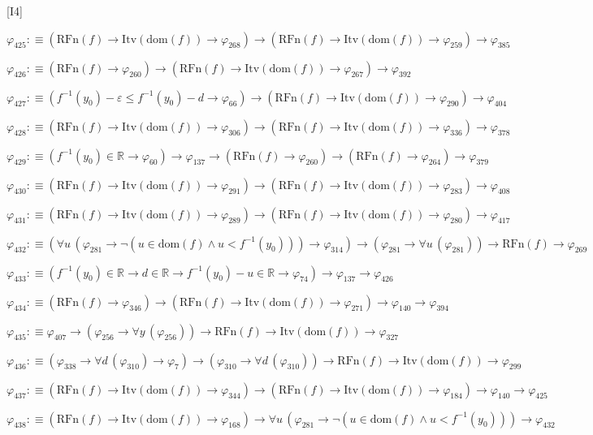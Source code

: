 \begin{fullproof}{[I4]}
\begin{abbrevlist}
\item $\varphi_{425} :\equiv (\mathrm{RFn}(f) \to \mathrm{Itv}(\mathrm{dom}(f)) \to \varphi_{268}) \to (\mathrm{RFn}(f) \to \mathrm{Itv}(\mathrm{dom}(f)) \to \varphi_{259}) \to \varphi_{385}$
\item $\varphi_{426} :\equiv (\mathrm{RFn}(f) \to \varphi_{260}) \to (\mathrm{RFn}(f) \to \mathrm{Itv}(\mathrm{dom}(f)) \to \varphi_{267}) \to \varphi_{392}$
\item $\varphi_{427} :\equiv (f^{-1}(y_{0}) - \varepsilon \leq f^{-1}(y_{0}) - d \to \varphi_{66}) \to (\mathrm{RFn}(f) \to \mathrm{Itv}(\mathrm{dom}(f)) \to \varphi_{290}) \to \varphi_{404}$
\item $\varphi_{428} :\equiv (\mathrm{RFn}(f) \to \mathrm{Itv}(\mathrm{dom}(f)) \to \varphi_{306}) \to (\mathrm{RFn}(f) \to \mathrm{Itv}(\mathrm{dom}(f)) \to \varphi_{336}) \to \varphi_{378}$
\item $\varphi_{429} :\equiv (f^{-1}(y_{0}) \in \mathbb{R} \to \varphi_{60}) \to \varphi_{137} \to (\mathrm{RFn}(f) \to \varphi_{260}) \to (\mathrm{RFn}(f) \to \varphi_{264}) \to \varphi_{379}$
\item $\varphi_{430} :\equiv (\mathrm{RFn}(f) \to \mathrm{Itv}(\mathrm{dom}(f)) \to \varphi_{291}) \to (\mathrm{RFn}(f) \to \mathrm{Itv}(\mathrm{dom}(f)) \to \varphi_{283}) \to \varphi_{408}$
\item $\varphi_{431} :\equiv (\mathrm{RFn}(f) \to \mathrm{Itv}(\mathrm{dom}(f)) \to \varphi_{289}) \to (\mathrm{RFn}(f) \to \mathrm{Itv}(\mathrm{dom}(f)) \to \varphi_{280}) \to \varphi_{417}$
\item $\varphi_{432} :\equiv (\forall u\,(\varphi_{281} \to \neg (u \in \mathrm{dom}(f) \land u < f^{-1}(y_{0}))) \to \varphi_{314}) \to (\varphi_{281} \to \forall u\,(\varphi_{281})) \to \mathrm{RFn}(f) \to \varphi_{269}$
\item $\varphi_{433} :\equiv (f^{-1}(y_{0}) \in \mathbb{R} \to d \in \mathbb{R} \to f^{-1}(y_{0}) - u \in \mathbb{R} \to \varphi_{74}) \to \varphi_{137} \to \varphi_{426}$
\item $\varphi_{434} :\equiv (\mathrm{RFn}(f) \to \varphi_{346}) \to (\mathrm{RFn}(f) \to \mathrm{Itv}(\mathrm{dom}(f)) \to \varphi_{271}) \to \varphi_{140} \to \varphi_{394}$
\item $\varphi_{435} :\equiv \varphi_{407} \to (\varphi_{256} \to \forall y\,(\varphi_{256})) \to \mathrm{RFn}(f) \to \mathrm{Itv}(\mathrm{dom}(f)) \to \varphi_{327}$
\item $\varphi_{436} :\equiv (\varphi_{338} \to \forall d\,(\varphi_{310}) \to \varphi_{7}) \to (\varphi_{310} \to \forall d\,(\varphi_{310})) \to \mathrm{RFn}(f) \to \mathrm{Itv}(\mathrm{dom}(f)) \to \varphi_{299}$
\item $\varphi_{437} :\equiv (\mathrm{RFn}(f) \to \mathrm{Itv}(\mathrm{dom}(f)) \to \varphi_{344}) \to (\mathrm{RFn}(f) \to \mathrm{Itv}(\mathrm{dom}(f)) \to \varphi_{184}) \to \varphi_{140} \to \varphi_{425}$
\item $\varphi_{438} :\equiv (\mathrm{RFn}(f) \to \mathrm{Itv}(\mathrm{dom}(f)) \to \varphi_{168}) \to \forall u\,(\varphi_{281} \to \neg (u \in \mathrm{dom}(f) \land u < f^{-1}(y_{0}))) \to \varphi_{432}$
\end{abbrevlist}
\end{fullproof}
